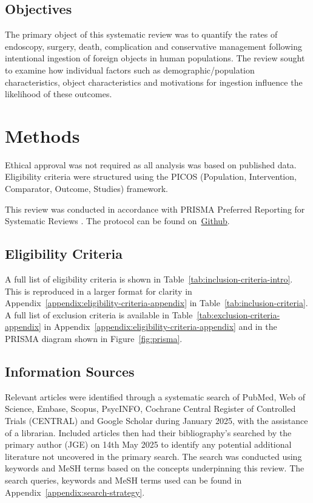 \documentclass[pdflatex,sn-basic,Numbered]{sn-jnl}
\begin{document}
\subsection{Objectives}
\noindent The primary object of this systematic review was to quantify the rates of endoscopy, surgery, death, complication and conservative management following intentional ingestion of foreign objects in human populations. The review sought to examine how individual factors such as demographic/population characteristics, object characteristics and motivations for ingestion influence the likelihood of these outcomes.


\section{Methods}

\noindent Ethical approval was not required as all analysis was based on published data. Eligibility criteria were structured using the PICOS (Population, Intervention, Comparator, Outcome, Studies) framework. 

This review was conducted in accordance with PRISMA Preferred Reporting for Systematic Reviews \cite{pagePRISMA2020Statement2021}. The protocol can be found on~\href{https://github.com/jackgedge/iifo_systematic_review/blob/main/docs/plan.md}{Github}.


\subsection{Eligibility Criteria}



\noindent A full list of eligibility criteria is shown in Table~\ref{tab:inclusion-criteria-intro}. This is reproduced in a larger format for clarity in Appendix~\ref{appendix:eligibility-criteria-appendix} in Table~\ref{tab:inclusion-criteria}. A full list of exclusion criteria is available in Table~\ref{tab:exclusion-criteria-appendix} in Appendix~\ref{appendix:eligibility-criteria-appendix} and in the PRISMA diagram shown in Figure~\ref{fig:prisma}.

\subsection{Information Sources}

\noindent Relevant articles were identified through a systematic search of PubMed, Web of Science, Embase, Scopus, PsycINFO, Cochrane Central Register of Controlled Trials (CENTRAL) and Google Scholar during January 2025, with the assistance of a librarian. Included articles then had their bibliography's searched by the primary author (JGE) on 14th May 2025 to identify any potential additional literature not uncovered in the primary search. The search was conducted using keywords and MeSH terms based on the concepts underpinning this review. The search queries, keywords and MeSH terms used can be found in Appendix~\ref{appendix:search-strategy}. 
\end{document}
